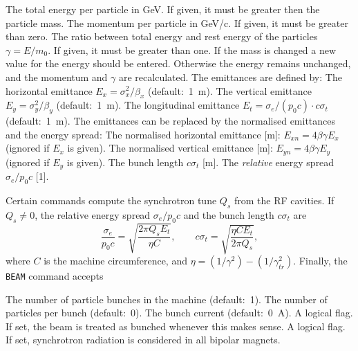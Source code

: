\begin{mylist}
The total energy per particle in GeV.
If given, it must be greater then the particle mass.
The momentum per particle in GeV/c.
If given, it must be greater than zero.
The ratio between total energy and rest energy of the particles
\(\gamma = E / m_{0}\).
If given, it must be greater than one.
If the mass is changed a new value for the energy should be entered.
Otherwise the energy remains unchanged,
and the momentum and \(\gamma\) are recalculated.
The emittances are defined by:
The horizontal emittance
\(E_{x}=\sigma_{x}^{2}/\beta_{x}\)
(default:~1~m).
The vertical emittance
\(E_{y}=\sigma_{y}^{2}/\beta_{y}\)
(default:~1~m).
The longitudinal emittance
\(E_{t}=\sigma_e/(p_0c) \cdot c\sigma_{t}\)
(default:~1~m).
The emittances can be replaced
by the normalised emittances and the energy spread:
The normalised horizontal emittance [m]:
\(E_{xn}=4\beta\gamma E_{x}\)
(ignored if \(E_{x}\) is given).
The normalised vertical emittance [m]:
\(E_{yn}=4\beta \gamma E_{y}\)
(ignored if \(E_{y}\) is given).
The bunch length \(c\sigma_{t}\) [m].
The {\em relative} energy spread \(\sigma_{e}/p_0 c\) [1].
\end{mylist}
Certain commands compute the synchrotron tune \(Q_{s}\)
from the RF cavities.
If \(Q_{s}\neq 0\),
the relative energy spread \(\sigma_{e}/p_{0}c\)
and the bunch length \(c\sigma_{t}\) are
\[
   \frac{\sigma_e}{p_0c}=\sqrt{\frac{2\pi Q_s E_t}{\eta C}},
   \qquad
   c\sigma_{t}=\sqrt{\frac{\eta C E_t}{2\pi Q_s}},
\]
where \(C\) is the machine circumference, and
\(\eta = (1/\gamma^{2}) - (1/\gamma_{tr}^{2})\).
Finally, the {\tt BEAM} command accepts
\begin{mylist}
The number of particle bunches in the machine (default:~1).
The number of particles per bunch (default:~0).
The bunch current (default:~0~A).
A logical flag.
If set, the beam is treated as bunched whenever this makes sense.
A logical flag.
If set, synchrotron radiation is considered in all bipolar magnets.
\end{mylist}
